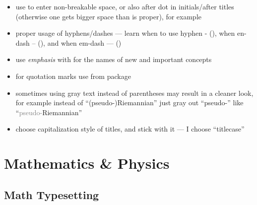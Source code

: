 \begin{itemize}
    \item use \macro{~} to enter non-breakable space, or also after dot in initials/after titles
          (otherwise one gets bigger space than is proper), for example 
    \item proper usage of hyphens/dashes --- learn when to use hyphen - (\macro{-}), when en-dash -- (\macro{--}), and when em-dash --- (\macro{---})
    \item use \emph{emphasis} with \macro{\emph} for the names of new and important concepts
    \item for quotation marks use \macro{\enquote} from  package
    \item sometimes using gray text instead of parentheses may result in a cleaner look, for example instead of \enquote{(pseudo-)Riemannian} just gray out \enquote{pseudo-} like \enquote{\textcolor{gray}{pseudo-}Riemannian}
    \item choose capitalization style of titles, and stick with it --- I choose \enquote{titlecase}
\end{itemize}


\section{Mathematics \& Physics}%
\label{sec:MathematicsandPhysics}

\subsection{Math Typesetting}%
\label{sub:Math Typesetting}

